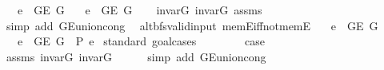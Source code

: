 \begin{isabellebody}
\ \ \ {\isachardoublequoteopen}e\ {\isasymin}\ G{\isachardot}{\kern0pt}E\ G{}{\isachardoublequoteclose}\isanewline
\ \ \ {\isachardoublequoteopen}e\ {\isasymin}\ G{\isachardot}{\kern0pt}E\ G{\isachardoublequoteclose}\isanewline
%
\isadelimproof
\ \ %
\endisadelimproof
%
\isatagproof
{}\isamarkupfalse%
\ invar{\isacharunderscore}{\kern0pt}G{}\ invar{\isacharunderscore}{\kern0pt}G{}\ assms\isanewline
\ \ \isamarkupfalse%
\ {\isacharparenleft}{\kern0pt}simp\ add{\isacharcolon}{\kern0pt}\ G{\isachardot}{\kern0pt}E{\isacharunderscore}{\kern0pt}union{\isacharunderscore}{\kern0pt}cong{\isacharparenright}{\kern0pt}%
\endisatagproof
{\isafoldproof}%
%
\isadelimproof
\isanewline
%
\endisadelimproof
\isanewline
{}\isamarkupfalse%
\ {\isacharparenleft}{\kern0pt}\ alt{\isacharunderscore}{\kern0pt}bfs{\isacharunderscore}{\kern0pt}valid{\isacharunderscore}{\kern0pt}input{\isacharparenright}{\kern0pt}\ mem{\isacharunderscore}{\kern0pt}E{}{\isacharunderscore}{\kern0pt}iff{\isacharunderscore}{\kern0pt}not{\isacharunderscore}{\kern0pt}mem{\isacharunderscore}{\kern0pt}E{}{\isacharcolon}{\kern0pt}\isanewline
\ \ \ {\isachardoublequoteopen}e\ {\isasymin}\ G{\isachardot}{\kern0pt}E\ G{\isachardoublequoteclose}\isanewline
\ \ \ {\isachardoublequoteopen}e\ {\isasymnotin}\ G{\isachardot}{\kern0pt}E\ G{}\ {\isacharequal}{\kern0pt}\ P{\isacharprime}{\kern0pt}{\isacharprime}{\kern0pt}\ e{\isachardoublequoteclose}\isanewline
%
\isadelimproof
%
\endisadelimproof
%
\isatagproof
{}\isamarkupfalse%
\ {\isacharparenleft}{\kern0pt}standard{\isacharcomma}{\kern0pt}\ goal{\isacharunderscore}{\kern0pt}cases{\isacharparenright}{\kern0pt}\isanewline
\ \ \isamarkupfalse%
\ {}\isanewline
\ \ \isamarkupfalse%
\ {\isacharquery}{\kern0pt}case\isanewline
\ \ \ \ \isamarkupfalse%
\ assms\ invar{\isacharunderscore}{\kern0pt}G{}\ invar{\isacharunderscore}{\kern0pt}G{}\isanewline
\ \ \ \ \isamarkupfalse%
\ {\isacharparenleft}{\kern0pt}simp\ add{\isacharcolon}{\kern0pt}\ G{\isachardot}{\kern0pt}E{\isacharunderscore}{\kern0pt}union{\isacharunderscore}{\kern0pt}cong{\isacharparenright}{\kern0pt}\isanewline
{}\isamarkupfalse%
\isanewline
\ \ \isamarkupfalse%
\ {}\isanewline
\ \ \isamarkupfalse%
\ \isamarkupfalse%

\end{isabellebody}
